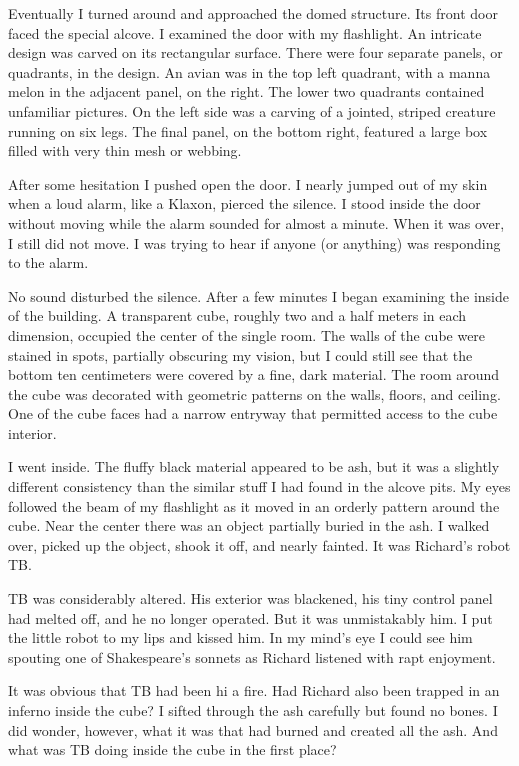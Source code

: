 \documentclass[]{article}
\begin{document}
Eventually I turned around and approached the domed structure. Its front door faced the special alcove. I examined the door with my flashlight. An intricate design was carved on its rectangular surface. There were four separate panels, or quadrants, in the design. An avian was in the top left quadrant, with a manna melon in the adjacent panel, on the right. The lower two quadrants contained unfamiliar pictures. On the left side was a carving of a jointed, striped creature running on six legs. The final panel, on the bottom right, featured a large box filled with very thin mesh or webbing.

After some hesitation I pushed open the door. I nearly jumped out of my skin when a loud alarm, like a Klaxon, pierced the silence. I stood inside the door without moving while the alarm sounded for almost a minute. When it was over, I still did not move. I was trying to hear if anyone (or anything) was responding to the alarm.

No sound disturbed the silence. After a few minutes I began examining the inside of the building. A transparent cube, roughly two and a half meters in each dimension, occupied the center of the single room. The walls of the cube were stained in spots, partially obscuring my vision, but I could still see that the bottom ten centimeters were covered by a fine, dark material. The room around the cube was decorated with geometric patterns on the walls, floors, and ceiling. One of the cube faces had a narrow entryway that permitted access to the cube interior.

I went inside. The fluffy black material appeared to be ash, but it was a slightly different consistency than the similar stuff I had found in the alcove pits. My eyes followed the beam of my flashlight as it moved in an orderly pattern around the cube. Near the center there was an object partially buried in the ash. I walked over, picked up the object, shook it off, and nearly fainted. It was Richard’s robot TB.

TB was considerably altered. His exterior was blackened, his tiny control panel had melted off, and he no longer operated. But it was unmistakably him. I put the little robot to my lips and kissed him. In my mind’s eye I could see him spouting one of Shakespeare’s sonnets as Richard listened with rapt enjoyment.

It was obvious that TB had been hi a fire. Had Richard also been trapped in an inferno inside the cube? I sifted through the ash carefully but found no bones. I did wonder, however, what it was that had burned and created all the ash. And what was TB doing inside the cube in the first place?
\end{document}
